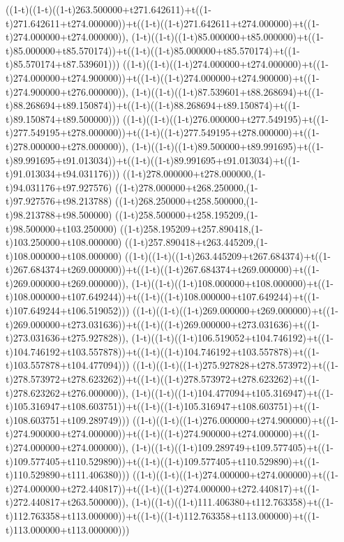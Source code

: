 ((1-t)((1-t)((1-t)263.500000+t271.642611)+t((1-t)271.642611+t274.000000))+t((1-t)((1-t)271.642611+t274.000000)+t((1-t)274.000000+t274.000000)),                                     (1-t)((1-t)((1-t)85.000000+t85.000000)+t((1-t)85.000000+t85.570174))+t((1-t)((1-t)85.000000+t85.570174)+t((1-t)85.570174+t87.539601)))
((1-t)((1-t)((1-t)274.000000+t274.000000)+t((1-t)274.000000+t274.900000))+t((1-t)((1-t)274.000000+t274.900000)+t((1-t)274.900000+t276.000000)),                                     (1-t)((1-t)((1-t)87.539601+t88.268694)+t((1-t)88.268694+t89.150874))+t((1-t)((1-t)88.268694+t89.150874)+t((1-t)89.150874+t89.500000)))
((1-t)((1-t)((1-t)276.000000+t277.549195)+t((1-t)277.549195+t278.000000))+t((1-t)((1-t)277.549195+t278.000000)+t((1-t)278.000000+t278.000000)),                                     (1-t)((1-t)((1-t)89.500000+t89.991695)+t((1-t)89.991695+t91.013034))+t((1-t)((1-t)89.991695+t91.013034)+t((1-t)91.013034+t94.031176)))
((1-t)278.000000+t278.000000,(1-t)94.031176+t97.927576)
((1-t)278.000000+t268.250000,(1-t)97.927576+t98.213788)
((1-t)268.250000+t258.500000,(1-t)98.213788+t98.500000)
((1-t)258.500000+t258.195209,(1-t)98.500000+t103.250000)
((1-t)258.195209+t257.890418,(1-t)103.250000+t108.000000)
((1-t)257.890418+t263.445209,(1-t)108.000000+t108.000000)
((1-t)((1-t)((1-t)263.445209+t267.684374)+t((1-t)267.684374+t269.000000))+t((1-t)((1-t)267.684374+t269.000000)+t((1-t)269.000000+t269.000000)),                                     (1-t)((1-t)((1-t)108.000000+t108.000000)+t((1-t)108.000000+t107.649244))+t((1-t)((1-t)108.000000+t107.649244)+t((1-t)107.649244+t106.519052)))
((1-t)((1-t)((1-t)269.000000+t269.000000)+t((1-t)269.000000+t273.031636))+t((1-t)((1-t)269.000000+t273.031636)+t((1-t)273.031636+t275.927828)),                                     (1-t)((1-t)((1-t)106.519052+t104.746192)+t((1-t)104.746192+t103.557878))+t((1-t)((1-t)104.746192+t103.557878)+t((1-t)103.557878+t104.477094)))
((1-t)((1-t)((1-t)275.927828+t278.573972)+t((1-t)278.573972+t278.623262))+t((1-t)((1-t)278.573972+t278.623262)+t((1-t)278.623262+t276.000000)),                                     (1-t)((1-t)((1-t)104.477094+t105.316947)+t((1-t)105.316947+t108.603751))+t((1-t)((1-t)105.316947+t108.603751)+t((1-t)108.603751+t109.289749)))
((1-t)((1-t)((1-t)276.000000+t274.900000)+t((1-t)274.900000+t274.000000))+t((1-t)((1-t)274.900000+t274.000000)+t((1-t)274.000000+t274.000000)),                                     (1-t)((1-t)((1-t)109.289749+t109.577405)+t((1-t)109.577405+t110.529890))+t((1-t)((1-t)109.577405+t110.529890)+t((1-t)110.529890+t111.406380)))
((1-t)((1-t)((1-t)274.000000+t274.000000)+t((1-t)274.000000+t272.440817))+t((1-t)((1-t)274.000000+t272.440817)+t((1-t)272.440817+t263.500000)),                                     (1-t)((1-t)((1-t)111.406380+t112.763358)+t((1-t)112.763358+t113.000000))+t((1-t)((1-t)112.763358+t113.000000)+t((1-t)113.000000+t113.000000)))
